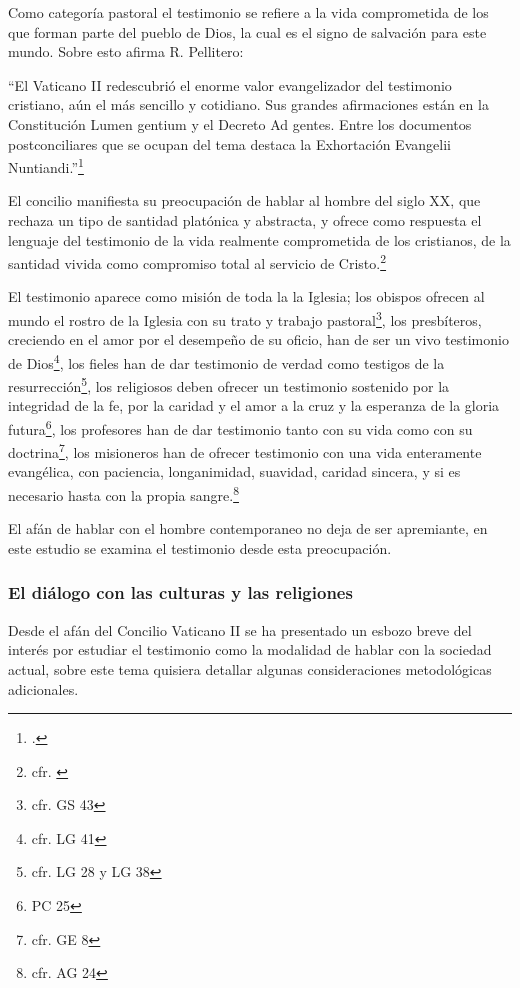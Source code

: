 \documentclass[12pt]{article}
\begin{document}
{Como categoría pastoral el testimonio se refiere a la vida comprometida de los que forman parte del pueblo de Dios, la cual es el signo de salvación para este mundo. Sobre esto afirma R. Pellitero:

``El Vaticano II redescubrió el enorme valor evangelizador del testimonio cristiano, aún el más sencillo y cotidiano. Sus grandes afirmaciones están en la Constitución Lumen gentium y el Decreto Ad gentes. Entre los documentos postconciliares que se ocupan del tema destaca la Exhortación Evangelii Nuntiandi.''\footcite[pp.~378--379]{ftcpellitero}

El concilio manifiesta su preocupación de hablar al hombre del siglo XX, que rechaza un tipo de santidad platónica y abstracta, y ofrece como respuesta el lenguaje del testimonio de la vida realmente comprometida de los cristianos, de la santidad vivida como compromiso total al servicio de Cristo.\footnote{cfr. \cite[p.~1532 y 1533]{dicctf}} 

El testimonio aparece como misión de toda la la Iglesia; los obispos ofrecen al mundo el rostro de la Iglesia con su trato y trabajo pastoral\footnote{cfr. GS 43}, los presbíteros, creciendo en el amor por el desempeño de su oficio, han de ser un vivo testimonio de Dios\footnote{cfr. LG 41}, los fieles han de dar testimonio de verdad como testigos de la resurrección\footnote{cfr. LG 28 y LG 38}, los religiosos deben ofrecer un testimonio sostenido por la integridad de la fe, por la caridad y el amor a la cruz y la esperanza de la gloria futura\footnote{PC 25}, los profesores han de dar testimonio tanto con su vida como con su doctrina\footnote{cfr. GE 8}, los misioneros han de ofrecer testimonio con una vida enteramente evangélica, con paciencia, longanimidad, suavidad, caridad sincera, y si es necesario hasta con la propia sangre.\footnote{cfr. AG 24}

El afán de hablar con el hombre contemporaneo no deja de ser apremiante, en este estudio se examina el testimonio desde esta preocupación. 

\subsubsection{El diálogo con las culturas y las religiones}
Desde el afán del Concilio Vaticano II se ha presentado un esbozo breve del interés por estudiar el testimonio como la modalidad de hablar con la sociedad actual, sobre este tema quisiera detallar algunas consideraciones metodológicas adicionales.

}
\end{document}
